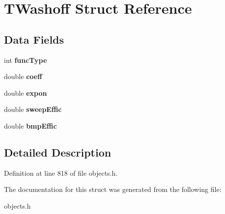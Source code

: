 \hypertarget{struct_t_washoff}{}\section{T\+Washoff Struct Reference}
\label{struct_t_washoff}
\subsection*{Data Fields}
\begin{DoxyCompactItemize}
\item 
\mbox{\label{struct_t_washoff_a5c897eedceaeaa8c830fe8ad7a12d61f}} 
int {\bfseries func\+Type}
\item 
\mbox{\label{struct_t_washoff_aa8c8f49390c3cf7c702d71a71bc977e3}} 
double {\bfseries coeff}
\item 
\mbox{\label{struct_t_washoff_aef7e4f438c6d6b4ddc83ee2347e8c28a}} 
double {\bfseries expon}
\item 
\mbox{\label{struct_t_washoff_a1a3ab6c594707397bf56369638d87258}} 
double {\bfseries sweep\+Effic}
\item 
\mbox{\label{struct_t_washoff_af0849a550ef9c6740185c1aaaa489f79}} 
double {\bfseries bmp\+Effic}
\end{DoxyCompactItemize}


\subsection{Detailed Description}


Definition at line 818 of file objects.\+h.



The documentation for this struct was generated from the following file\+:\begin{DoxyCompactItemize}
\item 
objects.\+h\end{DoxyCompactItemize}
